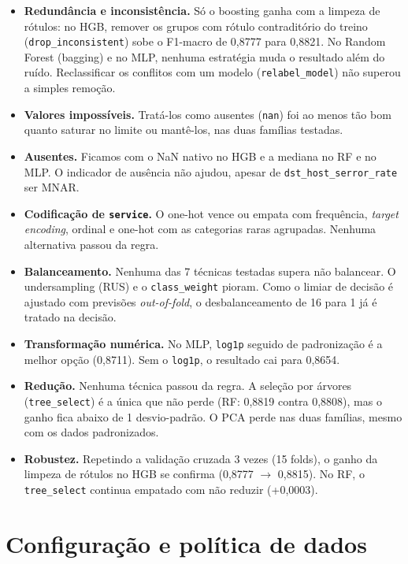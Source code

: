 \documentclass[11pt,a4paper]{article}
\begin{document}
\begin{itemize}
\item \textbf{Redundância e inconsistência.} Só o boosting ganha com a limpeza de rótulos: no HGB, remover os grupos com rótulo contraditório do treino (\texttt{drop\_inconsistent}) sobe o F1-macro de 0,8777 para 0,8821. No Random Forest (bagging) e no MLP, nenhuma estratégia muda o resultado além do ruído. Reclassificar os conflitos com um modelo (\texttt{relabel\_model}) não superou a simples remoção.
\item \textbf{Valores impossíveis.} Tratá-los como ausentes (\texttt{nan}) foi ao menos tão bom quanto saturar no limite ou mantê-los, nas duas famílias testadas.
\item \textbf{Ausentes.} Ficamos com o NaN nativo no HGB e a mediana no RF e no MLP. O indicador de ausência não ajudou, apesar de \texttt{dst\_host\_serror\_rate} ser MNAR.
\item \textbf{Codificação de \texttt{service}.} O one-hot vence ou empata com frequência, \emph{target encoding}, ordinal e one-hot com as categorias raras agrupadas. Nenhuma alternativa passou da regra.
\item \textbf{Balanceamento.} Nenhuma das 7 técnicas testadas supera não balancear. O undersampling (RUS) e o \texttt{class\_weight} pioram. Como o limiar de decisão é ajustado com previsões \emph{out-of-fold}, o desbalanceamento de 16 para 1 já é tratado na decisão.
\item \textbf{Transformação numérica.} No MLP, \texttt{log1p} seguido de padronização é a melhor opção (0,8711). Sem o \texttt{log1p}, o resultado cai para 0,8654.
\item \textbf{Redução.} Nenhuma técnica passou da regra. A seleção por árvores (\texttt{tree\_select}) é a única que não perde (RF: 0,8819 contra 0,8808), mas o ganho fica abaixo de 1 desvio-padrão. O PCA perde nas duas famílias, mesmo com os dados padronizados.
\item \textbf{Robustez.} Repetindo a validação cruzada 3 vezes (15 folds), o ganho da limpeza de rótulos no HGB se confirma (0,8777 $\rightarrow$ 0,8815). No RF, o \texttt{tree\_select} continua empatado com não reduzir (+0,0003).
\end{itemize}

\setcounter{section}{-1}

\section{Configuração e política de dados}
\end{document}

